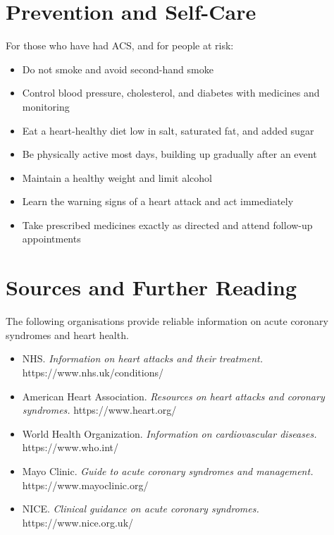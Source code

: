 \section*{Prevention and Self-Care}
For those who have had ACS, and for people at risk:

\begin{itemize}
    \item Do not smoke and avoid second-hand smoke
    \item Control blood pressure, cholesterol, and diabetes with medicines and monitoring
    \item Eat a heart-healthy diet low in salt, saturated fat, and added sugar
    \item Be physically active most days, building up gradually after an event
    \item Maintain a healthy weight and limit alcohol
    \item Learn the warning signs of a heart attack and act immediately
    \item Take prescribed medicines exactly as directed and attend follow-up appointments
\end{itemize}

\section*{Sources and Further Reading}
The following organisations provide reliable information on acute coronary syndromes and heart health.

\begin{itemize}
    \item NHS. \textit{Information on heart attacks and their treatment.} https://www.nhs.uk/conditions/
    \item American Heart Association. \textit{Resources on heart attacks and coronary syndromes.} https://www.heart.org/
    \item World Health Organization. \textit{Information on cardiovascular diseases.} https://www.who.int/
    \item Mayo Clinic. \textit{Guide to acute coronary syndromes and management.} https://www.mayoclinic.org/
    \item NICE. \textit{Clinical guidance on acute coronary syndromes.} https://www.nice.org.uk/
\end{itemize}
